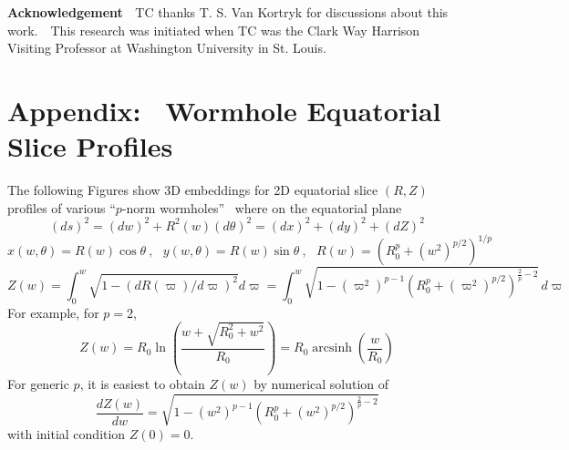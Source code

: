 \documentclass{article}%
\begin{document}
\noindent\textbf{Acknowledgement \ }TC thanks T. S. Van Kortryk for
discussions about this work.\ \ This research was initiated when TC was the
Clark Way Harrison Visiting Professor at Washington University in St.
Louis.\bigskip

\newpage

\section{Appendix: \ Wormhole Equatorial Slice Profiles}

The following Figures show 3D embeddings for 2D equatorial slice $\left(
R,Z\right)  $ profiles of various \textquotedblleft$p$-norm
wormholes\textquotedblright\ \cite{CA et al.,AC} where on the equatorial
plane
\begin{equation}
\left(  ds\right)  ^{2}=\left(  dw\right)  ^{2}+R^{2}\left(  w\right)  \left(
d\theta\right)  ^{2}=\left(  dx\right)  ^{2}+\left(  dy\right)  ^{2}+\left(
dZ\right)  ^{2} \tag{F1}%
\end{equation}%
\begin{equation}
x\left(  w,\theta\right)  =R\left(  w\right)  \cos\theta\ ,\ \ \ y\left(
w,\theta\right)  =R\left(  w\right)  \sin\theta\ ,\ \ \ R\left(  w\right)
=\left(  R_{0}^{p}+\left(  w^{2}\right)  ^{p/2}\right)  ^{1/p} \tag{F2}%
\end{equation}%
\begin{equation}
Z\left(  w\right)  =\int_{0}^{w}\sqrt{1-\left(  dR\left(  \varpi\right)
/d\varpi\right)  ^{2}}d\varpi=\int_{0}^{w}\sqrt{1-\left(  \varpi^{2}\right)
^{p-1}\left(  R_{0}^{p}+\left(  \varpi^{2}\right)  ^{p/2}\right)  ^{\frac
{2}{p}-2}}\,d\varpi\tag{F3}%
\end{equation}
For example, for $p=2$,%
\begin{equation}
Z\left(  w\right)  =R_{0}\ln\left(  \frac{w+\sqrt{R_{0}^{2}+w^{2}}}{R_{0}%
}\right)  =R_{0}\operatorname{arcsinh}\left(  \frac{w}{R_{0}}\right)  \tag{F4}%
\end{equation}
For generic $p$, it is easiest to obtain $Z\left(  w\right)  $ by numerical
solution of
\begin{equation}
\frac{dZ\left(  w\right)  }{dw}=\sqrt{1-\left(  w^{2}\right)  ^{p-1}\left(
R_{0}^{p}+\left(  w^{2}\right)  ^{p/2}\right)  ^{\frac{2}{p}-2}} \tag{F5}%
\end{equation}
with initial condition $Z\left(  0\right)  =0$.%
\end{document}
